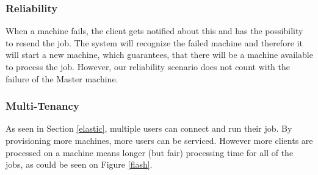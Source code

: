 \subsubsection{Reliability}
When a machine fails, the client gets notified about this and has the possibility to resend the job. The system will recognize the failed machine and therefore it will start a new machine, which guarantees, that there will be a machine available to process the job. However, our reliability scenario does not count with the failure of the Master machine.

\subsubsection{Multi-Tenancy}
As seen in Section \ref{elastic}, multiple users can connect and run their job. By provisioning more machines, more users can be serviced. However more clients are processed on a machine means longer (but fair) processing time for all of the jobs, as could be seen on Figure \ref{flash}.